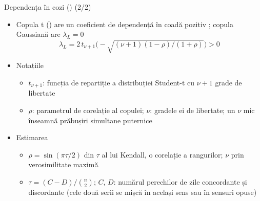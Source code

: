 \begin{frame}{Dependența în cozi () (2/2)}
\itemsize{\small}
\begin{itemize}
    \item Copula t () are un coeficient de dependență în coadă pozitiv ; copula Gaussiană are $\lambda_L = 0$ \[ \lambda_L = 2\,t_{\nu+1}\Big(-\sqrt{(\nu + 1)(1 - \rho)/(1 + \rho)}\Big) > 0 \]
    \item Notațiile
    \begin{itemize}
        \item $t_{\nu+1}$: funcția de repartiție a distribuției Student-t cu $\nu + 1$ grade de libertate
        \item $\rho$: parametrul de corelație al copulei; $\nu$: gradele ei de libertate; un $\nu$ mic înseamnă prăbușiri simultane puternice
    \end{itemize}
    \item Estimarea
    \begin{itemize}
        \item $\rho = \sin(\pi\tau/2)$ din $\tau$ al lui Kendall, o corelație a rangurilor; $\nu$ prin verosimilitate maximă
        \item $\tau = (C - D)/\binom{n}{2}$; $C$, $D$: numărul perechilor de zile concordante și discordante (cele două serii se mișcă în același sens sau în sensuri opuse)
    \end{itemize}
\end{itemize}
\end{frame}

